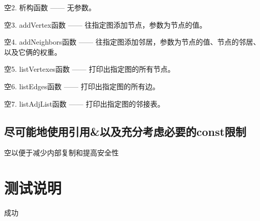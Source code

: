 \documentclass[UTF8]{ctexart}
\begin{document}
\hphantom 空2. 析构函数 —— 无参数。\newline

\hphantom 空3. addVertex函数 —— 往指定图添加节点，参数为节点的值。\newline

\hphantom 空4. addNeighbors函数 —— 往指定图添加邻居，参数为节点的值、节点的邻居、以及它俩的权重。\newline

\hphantom 空5. listVertexes函数 —— 打印出指定图的所有节点。\newline

\hphantom 空6. listEdges函数 —— 打印出指定图的所有边。\newline

\hphantom 空7. listAdjList函数 —— 打印出指定图的邻接表。

\subsection{尽可能地使用引用\&以及充分考虑必要的const限制}
\hphantom 空以便于减少内部复制和提高安全性

\section{测试说明}

成功
\end{document}
